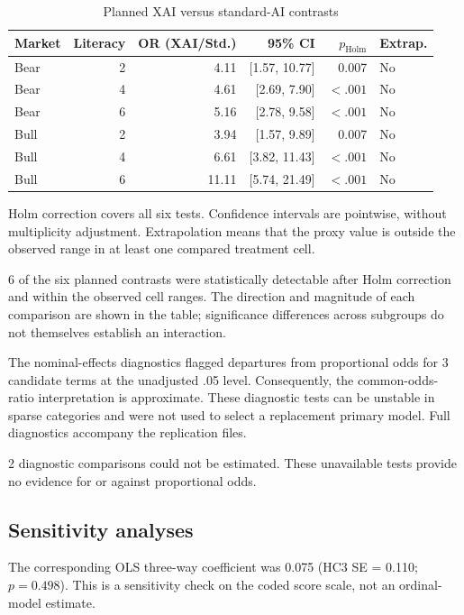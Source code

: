 \documentclass[11pt,a4paper]{article}
\begin{document}
\begin{table}[htbp]
\centering
\small
\caption{Planned XAI versus standard-AI contrasts}
\begin{tabular}{lrrrrl}
\toprule
Market & Literacy & OR (XAI/Std.) & 95\% CI & $p_{\mathrm{Holm}}$ & Extrap.\\
\midrule
Bear & 2 & 4.11 & [1.57, 10.77] & 0.007 & No\\
Bear & 4 & 4.61 & [2.69, 7.90] & $<.001$ & No\\
Bear & 6 & 5.16 & [2.78, 9.58] & $<.001$ & No\\
Bull & 2 & 3.94 & [1.57, 9.89] & 0.007 & No\\
Bull & 4 & 6.61 & [3.82, 11.43] & $<.001$ & No\\
Bull & 6 & 11.11 & [5.74, 21.49] & $<.001$ & No\\
\bottomrule
\end{tabular}
\par\smallskip
\begin{minipage}{.96\linewidth}\footnotesize Holm correction covers all six tests. Confidence intervals are pointwise, without multiplicity adjustment. Extrapolation means that the proxy value is outside the observed range in at least one compared treatment cell.\end{minipage}
\end{table}

6 of the six planned contrasts were statistically detectable after Holm correction and within the observed cell ranges. The direction and magnitude of each comparison are shown in the table; significance differences across subgroups do not themselves establish an interaction.

The nominal-effects diagnostics flagged departures from proportional odds for 3 candidate terms at the unadjusted .05 level. Consequently, the common-odds-ratio interpretation is approximate. These diagnostic tests can be unstable in sparse categories and were not used to select a replacement primary model. Full diagnostics accompany the replication files.

2 diagnostic comparisons could not be estimated. These unavailable tests provide no evidence for or against proportional odds.

\subsection{Sensitivity analyses}

The corresponding OLS three-way coefficient was 0.075 (HC3 SE = 0.110; $p=0.498$). This is a sensitivity check on the coded score scale, not an ordinal-model estimate.
\end{document}
